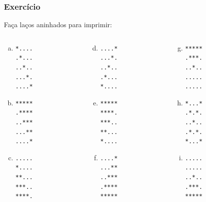 \documentclass[xcolor={dvipsnames,table},aspectratio=169]{beamer}
\begin{document}
\begin{frame}[fragile]\frametitle{Exercício}
{\scriptsize
Faça laços aninhados para imprimir:
\begin{columns}[T]
	\begin{column}{0.34\linewidth}
\begin{enumerate}[a)]
	\item
\begin{verbatim}
*....
.*...
..*..
...*.
....*
\end{verbatim}
	\item
\begin{verbatim}
*****
.****
..***
...**
....*
\end{verbatim}
	\item
\begin{verbatim}
.....
*....
**...
***..
****.
\end{verbatim}
\end{enumerate}
	\end{column}
	\begin{column}{0.33\linewidth}
\begin{enumerate}[a)]
  \setcounter{enumi}{3}
	\item
\begin{verbatim}
....*
...*.
..*..
.*...
*....
\end{verbatim}
	\item
\begin{verbatim}
*****
****.
***..
**...
*....
\end{verbatim}
	\item
\begin{verbatim}
....*
...**
..***
.****
*****
\end{verbatim}
\end{enumerate}
	\end{column}
	\begin{column}{0.33\linewidth}
\begin{enumerate}[a)]
  \setcounter{enumi}{6}
	\item
\begin{verbatim}
*****
.***.
..*..
.....
.....
\end{verbatim}
	\item
\begin{verbatim}
*...*
.*.*.
..*..
.*.*.
*...*
\end{verbatim}
	\item
\begin{verbatim}
.....
.....
..*..
.***.
*****
\end{verbatim}
\end{enumerate}
	\end{column}
\end{columns}
}
\end{frame}
\end{document}

